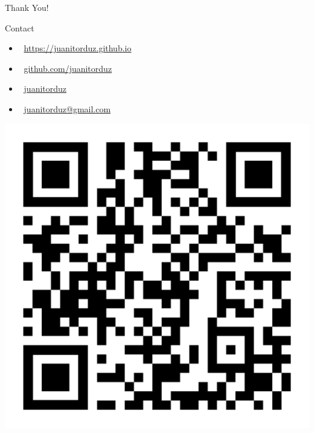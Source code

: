 \documentclass[10pt]{beamer}
\begin{document}
\begin{frame}
\begin{center}
\huge{Thank You!}
\end{center}

\begin{block}{Contact}
\begin{itemize}
\item \faRocket $\:$ \href{https://juanitorduz.github.io}{https://juanitorduz.github.io}
\item \faGithub $\:$ \href{https://github.com/juanitorduz}{github.com/juanitorduz}
\item \faTwitter $\:$ \href{https://twitter.com/juanitorduz}{juanitorduz}
\item \faEnvelope $\:$ \href{mailto:juanitorduz@gmail.com}{juanitorduz@gmail.com}
\end{itemize}
\end{block}

\begin{center}
\includegraphics[scale=0.08]{images/qr-code-juanitorduz.png} 
\end{center}

\end{frame}
\end{document}
